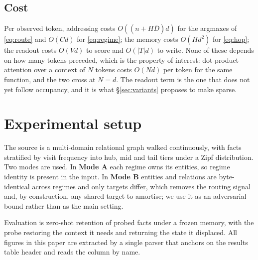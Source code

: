 \documentclass[11pt,a4paper]{article}
\begin{document}
\subsection{Cost}
\label{sec:costmodel}

Per observed token, addressing costs $O\!\left((n + H\bar{D})d\right)$ for the
argmaxes of \eqref{eq:route} and $O(Cd)$ for \eqref{eq:regime}; the memory
costs $O(Hd^2)$ for \eqref{eq:hop}; the readout costs $O(Vd)$ to score and
$O(|T|d)$ to write. None of these depends on how many tokens preceded, which is
the property of interest: dot-product attention over a context of $N$ tokens
costs $O(Nd)$ per token for the same function, and the two cross at $N=d$. The
readout term is the one that does not yet follow occupancy, and it is what
\S\ref{sec:variants} proposes to make sparse.

\section{Experimental setup}

The source is a multi-domain relational graph walked continuously, with facts
stratified by visit frequency into hub, mid and tail tiers under a Zipf
distribution. Two modes are used. In \textbf{Mode A} each regime owns its
entities, so regime identity is present in the input. In \textbf{Mode B}
entities and relations are byte-identical across regimes and only targets
differ, which removes the routing signal and, by construction, any shared target
to amortise; we use it as an adversarial bound rather than as the main setting.

Evaluation is zero-shot retention of probed facts under a frozen memory, with
the probe restoring the context it needs and returning the state it displaced.
All figures in this paper are extracted by a single parser that anchors on the
results table header and reads the column by name.
\end{document}
